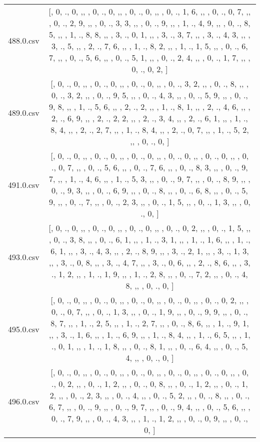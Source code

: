 \begin{table}[ht]
\begin{tabular}{@{}c c@{}}
	488.0.csv & [, 0, ., 0, ,,  , 0, ., 0, ,,  , 0, ., 0, ,,  , 0, ., 1, 6, ,,  , 0, ., 0, 7, ,,  , 0, ., 2, 9, ,,  , 0, ., 3, 3, ,,  , 0, ., 9, ,,  , 1, ., 4, 9, ,,  , 0, ., 8, 5, ,,  , 1, ., 8, 8, ,,  , 3, ., 0, 1, ,,  , 3, ., 3, 7, ,,  , 3, ., 4, 3, ,,  , 3, ., 5, ,,  , 2, ., 7, 6, ,,  , 1, ., 8, 2, ,,  , 1, ., 1, 5, ,,  , 0, ., 6, 7, ,,  , 0, ., 5, 6, ,,  , 0, ., 5, 1, ,,  , 0, ., 2, 4, ,,  , 0, ., 1, 7, ,,  , 0, ., 0, 2, ]\\ 
	489.0.csv & [, 0, ., 0, ,,  , 0, ., 0, ,,  , 0, ., 0, ,,  , 0, ., 3, 2, ,,  , 0, ., 8, ,,  , 0, ., 3, 2, ,,  , 0, ., 9, 5, ,,  , 0, ., 4, 3, ,,  , 0, ., 5, 9, ,,  , 0, ., 9, 8, ,,  , 1, ., 5, 6, ,,  , 2, ., 2, ,,  , 1, ., 8, 1, ,,  , 2, ., 4, 6, ,,  , 2, ., 6, 9, ,,  , 2, ., 2, 2, ,,  , 2, ., 3, 4, ,,  , 2, ., 6, 1, ,,  , 1, ., 8, 4, ,,  , 2, ., 2, 7, ,,  , 1, ., 8, 4, ,,  , 2, ., 0, 7, ,,  , 1, ., 5, 2, ,,  , 0, ., 0, ]\\ 
	491.0.csv & [, 0, ., 0, ,,  , 0, ., 0, ,,  , 0, ., 0, ,,  , 0, ., 0, ,,  , 0, ., 0, ,,  , 0, ., 0, 7, ,,  , 0, ., 5, 6, ,,  , 0, ., 7, 6, ,,  , 0, ., 8, 3, ,,  , 0, ., 9, 7, ,,  , 1, ., 4, 6, ,,  , 1, ., 5, 3, ,,  , 0, ., 9, 7, ,,  , 0, ., 8, 9, ,,  , 0, ., 9, 3, ,,  , 0, ., 6, 9, ,,  , 0, ., 8, ,,  , 0, ., 6, 8, ,,  , 0, ., 5, 9, ,,  , 0, ., 7, ,,  , 0, ., 2, 3, ,,  , 0, ., 1, 5, ,,  , 0, ., 1, 3, ,,  , 0, ., 0, ]\\ 
	493.0.csv & [, 0, ., 0, ,,  , 0, ., 0, ,,  , 0, ., 0, ,,  , 0, ., 0, 2, ,,  , 0, ., 1, 5, ,,  , 0, ., 3, 8, ,,  , 0, ., 6, 1, ,,  , 1, ., 3, 1, ,,  , 1, ., 1, 6, ,,  , 1, ., 6, 1, ,,  , 3, ., 4, 3, ,,  , 2, ., 8, 9, ,,  , 3, ., 2, 1, ,,  , 3, ., 1, 3, ,,  , 3, ., 0, 8, ,,  , 3, ., 4, 7, ,,  , 3, ., 0, 6, ,,  , 2, ., 8, 6, ,,  , 3, ., 1, 2, ,,  , 1, ., 1, 9, ,,  , 1, ., 2, 8, ,,  , 0, ., 7, 2, ,,  , 0, ., 4, 8, ,,  , 0, ., 0, ]\\ 
	495.0.csv & [, 0, ., 0, ,,  , 0, ., 0, ,,  , 0, ., 0, ,,  , 0, ., 0, ,,  , 0, ., 0, 2, ,,  , 0, ., 0, 7, ,,  , 0, ., 1, 3, ,,  , 0, ., 1, 9, ,,  , 0, ., 9, 9, ,,  , 0, ., 8, 7, ,,  , 1, ., 2, 5, ,,  , 1, ., 2, 7, ,,  , 0, ., 8, 6, ,,  , 1, ., 9, 1, ,,  , 3, ., 1, 6, ,,  , 1, ., 6, 9, ,,  , 1, ., 8, 4, ,,  , 1, ., 6, 5, ,,  , 1, ., 0, 1, ,,  , 1, ., 1, 8, ,,  , 0, ., 8, 1, ,,  , 0, ., 6, 4, ,,  , 0, ., 5, 4, ,,  , 0, ., 0, ]\\ 
	496.0.csv & [, 0, ., 0, ,,  , 0, ., 0, ,,  , 0, ., 0, ,,  , 0, ., 0, ,,  , 0, ., 0, ,,  , 0, ., 0, 2, ,,  , 0, ., 1, 2, ,,  , 0, ., 0, 8, ,,  , 0, ., 1, 2, ,,  , 0, ., 1, 2, ,,  , 0, ., 2, 3, ,,  , 0, ., 4, ,,  , 0, ., 5, 2, ,,  , 0, ., 8, ,,  , 0, ., 6, 7, ,,  , 0, ., 9, ,,  , 0, ., 9, 7, ,,  , 0, ., 9, 4, ,,  , 0, ., 5, 6, ,,  , 0, ., 7, 9, ,,  , 0, ., 4, 3, ,,  , 1, ., 1, 2, ,,  , 0, ., 0, 9, ,,  , 0, ., 0, ]\\ 

\end{tabular}
\end{table}
